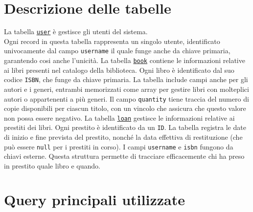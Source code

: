 \documentclass[]{report}
\begin{document}
\section{Descrizione delle tabelle}
La tabella \texttt{\underline{user}} è gestisce gli utenti del sistema.\\
Ogni record in questa tabella rappresenta un singolo utente, identificato univocamente dal campo \texttt{username} il quale funge anche da chiave primaria, garantendo cosi anche l'unicità.\bskip
La tabella \texttt{\underline{book}} contiene le informazioni relative ai libri presenti nel catalogo della biblioteca. Ogni libro è identificato dal suo codice \texttt{ISBN}, che funge da chiave primaria. La tabella include campi anche per gli autori e i generi, entrambi memorizzati come array per gestire libri con molteplici autori o appartenenti a più generi. Il campo \texttt{quantity} tiene traccia del numero di copie disponibili per ciascun titolo, con un vincolo che assicura che questo valore non possa essere negativo.\bskip
La tabella \texttt{\underline{loan}} gestisce le informazioni relative ai prestiti dei libri. Ogni prestito è identificato da un \texttt{ID}.\sskip
La tabella registra le date di inizio e fine prevista del prestito, nonché la data effettiva di restituzione (che può essere \texttt{null} per i prestiti in corso).\sskip
I campi \texttt{username} e \texttt{isbn} fungono da chiavi esterne. Questa struttura permette di tracciare efficacemente chi ha preso in prestito quale libro e quando.


\section{Query principali utilizzate}
\end{document}
